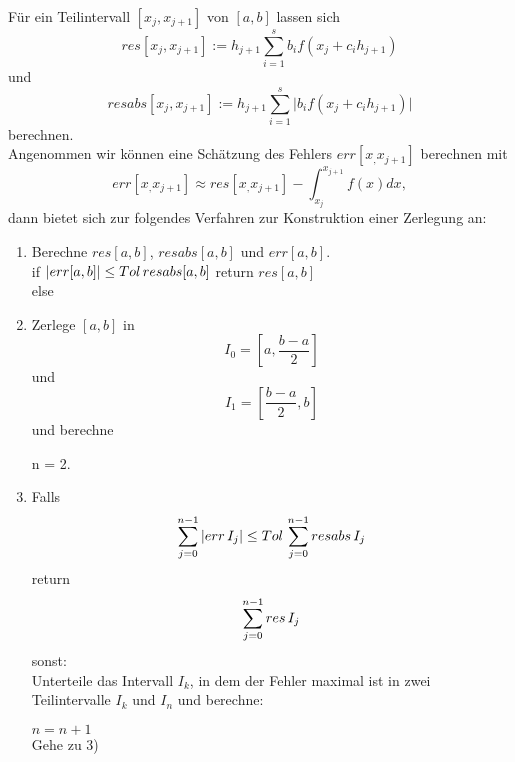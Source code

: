 \begin{nothing}
Für ein Teilintervall $[x_j, x_{j+1}]$ von $[a,b]$ lassen sich 
$$res[x_j, x_{j+1}] := h_{j+1} \sum_{i=1}^s b_i f(x_j + c_i h_{j+1})$$
und
$$ resabs[x_j, x_{j+1}] := h_{j+1} \sum_{i=1}^s \vert b_i f(x_j + c_i h_{j+1}) \vert$$
berechnen.\\
Angenommen wir können eine Schätzung des Fehlers $err[x_, x_{j+1}]$ berechnen mit
$$err[x_, x_{j+1}] \approx res[x_, x_{j+1}] - \int_{x_j}^{x_{j+1}} f(x) dx,$$
dann bietet sich zur folgendes Verfahren zur Konstruktion einer Zerlegung an:
\begin{enumerate}
  \item Berechne $res[a,b]$, $resabs[a,b]$ und $err[a, b]$. \\
    if $\vert err[a,b] \vert \leq Tol \thinspace resabs[a,b]$ return $res[a,b]$ \\
    else
    
  \item Zerlege $[a,b]$ in 
    $$I_0 = \left[a,\frac{b-a}{2}\right]$$
    und
    $$I_1 = \left[ \frac{b-a}{2}, b \right]$$
    und berechne 
    n = 2.
    
  \item Falls 
    $$ \sum_{j=0}^{n-1} \vert err \thinspace I_j \vert \leq Tol \thinspace \sum_{j=0}^{n-1} resabs \thinspace I_j$$
    return
    $$ \sum_{j=0}^{n-1} res \thinspace I_j$$
    sonst: \\
    Unterteile das Intervall $I_k$, in dem der Fehler maximal ist in zwei Teilintervalle $I_k$ und $I_n$ und berechne:
    $n =n+1$ \\
    Gehe zu 3)
\end{enumerate}
\end{nothing}

